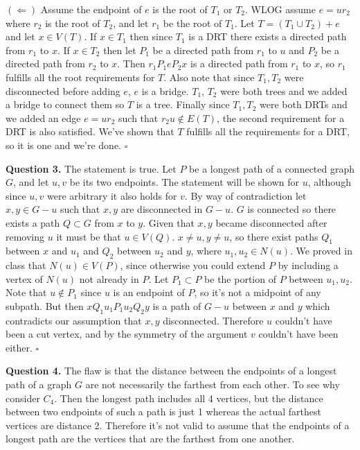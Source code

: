 \documentclass[letterpaper, reqno,11pt]{article}
\begin{document}
$(\Leftarrow)$ Assume the endpoint of $e$ is the root of $T_1$ or $T_2$. WLOG assume $e=ur_2$ where $r_2$ is the root of $T_2$, and let $r_1$ be the root of $T_1$. Let $T=(T_1\cup T_2)+e$ and let $x\in V(T)$. If $x\in T_1$ then since $T_1$ is a DRT there exists a directed path from $r_1$ to $x$. If $x\in T_2$ then let $P_1$ be a directed path from $r_1$ to $u$ and $P_2$ be a directed path from $r_2$ to $x$. Then $r_1P_1eP_2x$ is a directed path from $r_1$ to $x$, so $r_1$ fulfills all the root requirements for $T$. Also note that since $T_1,T_2$ were disconnected before adding $e$, $e$ is a bridge. $T_1$, $T_2$ were both trees and we added a bridge to connect them so $T$ is a tree. Finally since $T_1,T_2$ were both DRTs and we added an edge $e=ur_2$ such that $r_2u\notin E(T)$, the second requirement for a DRT is also satisfied. We've shown that $T$ fulfills all the requirements for a DRT, so it is one and we're done. $\square$


{\medskip\noindent\bf Question 3.} The statement is true. Let $P$ be a longest path of a connected graph $G$, and let $u,v$ be its two endpoints. The statement will be shown for $u$, although since $u,v$ were arbitrary it also holds for $v$. By way of contradiction let $x,y\in G-u$ such that $x,y$ are disconnected in $G-u$. $G$ is connected so there exists a path $Q\subset G$ from $x$ to $y$. Given that $x,y$ became disconnected after removing $u$ it must be that $u\in V(Q)$. $x\neq u,y\neq u$, so there exist paths $Q_1$ between $x$ and $u_1$ and $Q_2$ between $u_2$ and $y$, where $u_1,u_2\in N(u)$. We proved in class that $N(u)\in V(P)$, since otherwise you could extend $P$ by including a vertex of $N(u)$ not already in $P$. Let $P_1\subset P$ be the portion of $P$ between $u_1,u_2$. Note that $u\notin P_1$ since $u$ is an endpoint of $P$, so it's not a midpoint of any subpath. But then $xQ_1u_1P_1u_2Q_2y$ is a path of $G-u$ between $x$ and $y$ which contradicts our assumption that $x,y$ disconnected. Therefore $u$ couldn't have been a cut vertex, and by the symmetry of the argument $v$ couldn't have been either. $\square$

{\medskip\noindent\bf Question 4.} The flaw is that the distance between the endpoints of a longest path of a graph $G$ are not necessarily the farthest from each other. To see why consider $C_4$. Then the longest path includes all 4 vertices, but the distance between two endpoints of such a path is just 1 whereas the actual farthest vertices are distance 2. Therefore it's not valid to assume that the endpoints of a longest path are the vertices that are the farthest from one another. 
\end{document}
